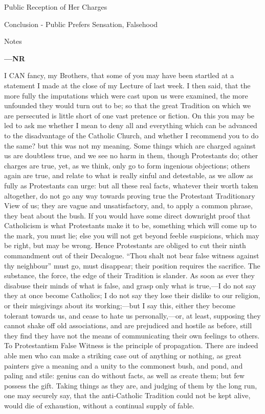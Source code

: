 Public
Reception of Her Charges

Conclusion - Public
Prefers Sensation, Falsehood

Notes

\textbf{—NR}

I CAN fancy, my Brothers, that some of you may have
been startled at a statement I made at the close of my
Lecture of last week. I then said, that the more fully
the imputations which were cast upon us were examined,
the more unfounded they would turn out to be; so that the
great Tradition on which we are persecuted is little
short of one vast pretence or fiction. On this you may be
led to ask me whether I mean to deny all and everything
which can be advanced to the disadvantage of the Catholic
Church, and whether I recommend you to do the same? but
this was not my meaning. Some things which are charged
against us are doubtless true, and we see no harm in
them, though Protestants do; other charges are true, yet,
as we think, only go to form ingenious objections; others
again are true, and relate to what is really sinful and
detestable, as we allow as fully as Protestants can urge:
but all these real facts, whatever their worth taken
altogether, do not go any way towards proving true the
Protestant Traditionary View of us; they are vague and
unsatisfactory, and, to apply a common phrase, they beat
about the bush. If you would have some direct downright
proof that Catholicism is what Protestants make it to be,
something which will come up to the mark, you must lie;
else you will not get beyond feeble suspicions, which may
be right, but may be wrong. Hence Protestants are obliged
to cut their ninth commandment out of their Decalogue.
``Thou shalt not bear false witness against thy
neighbour'' must go, must disappear; their position
requires the sacrifice. The substance, the force, the
edge of their Tradition is slander. As soon as ever they
disabuse their minds of what is false, and grasp only
what is true,—I do not say they at once become
Catholics; I do not say they lose their dislike to our
religion, or their misgivings about its working;—but
I say this, either they become tolerant towards us, and
cease to hate us personally,—or, at least, supposing
they cannot shake off old associations, and are
prejudiced and hostile as before, still they find they
have not the means of communicating their own feelings to
others. To Protestantism False Witness is the principle
of propagation. There are indeed able men who can make a
striking case out of anything or nothing, as great
painters give a meaning and a unity to the commonest
bush, and pond, and paling and stile: genius can do
without facts, as well as create them; but few possess
the gift. Taking things as they are, and judging of them
by the long run, one may securely say, that the
anti-Catholic Tradition could not be kept alive, would
die of exhaustion, without a continual supply of fable.

